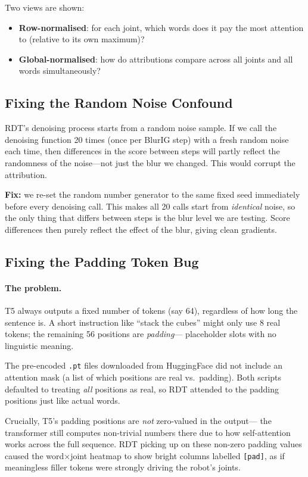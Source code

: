 \documentclass[11pt,a4paper]{article}
\begin{document}
Two views are shown:
\begin{itemize}
    \item \textbf{Row-normalised}: for each joint, which words does it
          pay the most attention to (relative to its own maximum)?
    \item \textbf{Global-normalised}: how do attributions compare
          across all joints and all words simultaneously?
\end{itemize}

\subsection{Fixing the Random Noise Confound}
\label{sec:seed}

RDT's denoising process starts from a random noise sample. If we call
the denoising function 20 times (once per BlurIG step) with a fresh
random noise each time, then differences in the score between steps will
partly reflect the randomness of the noise---not just the blur we changed.
This would corrupt the attribution.

\textbf{Fix:} we re-set the random number generator to the same fixed seed
immediately before every denoising call. This makes all 20 calls start from
\emph{identical} noise, so the only thing that differs between steps is the
blur level we are testing. Score differences then purely reflect the effect
of the blur, giving clean gradients.

\subsection{Fixing the Padding Token Bug}
\label{sec:pad}

\paragraph{The problem.}
T5 always outputs a fixed number of tokens (say 64), regardless of how
long the sentence is. A short instruction like ``stack the cubes'' might
only use 8 real tokens; the remaining 56 positions are \emph{padding}---
placeholder slots with no linguistic meaning.

The pre-encoded \texttt{.pt} files downloaded from HuggingFace did not
include an attention mask (a list of which positions are real vs.\ padding).
Both scripts defaulted to treating \emph{all} positions as real, so
RDT attended to the padding positions just like actual words.

Crucially, T5's padding positions are \emph{not} zero-valued in the output---
the transformer still computes non-trivial numbers there due to how self-attention
works across the full sequence. RDT picking up on these non-zero padding values
caused the word$\times$joint heatmap to show bright columns labelled
\texttt{[pad]}, as if meaningless filler tokens were strongly driving the
robot's joints.
\end{document}
